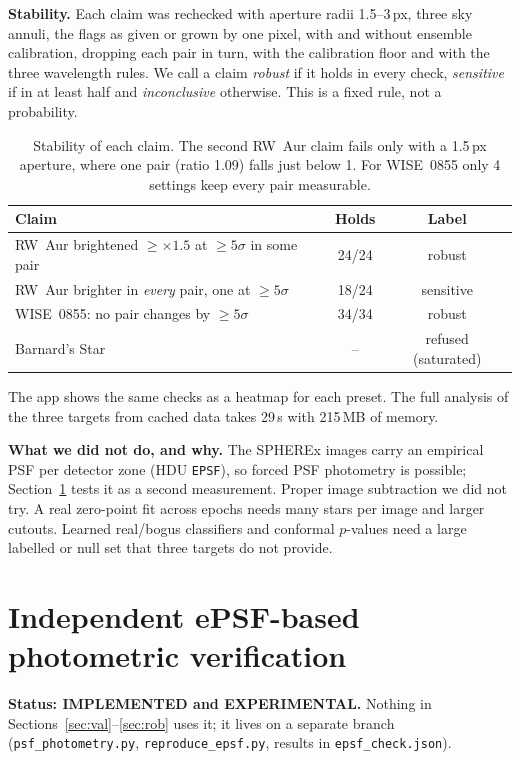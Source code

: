 \documentclass[11pt,a4paper]{article}
\begin{document}
\textbf{Stability.} Each claim was rechecked with aperture radii 1.5--3\,px, three sky annuli, the flags as given or
grown by one pixel, with and without ensemble calibration, dropping each pair in turn, with the calibration floor
and with the three wavelength rules. We call a claim \emph{robust} if it holds in every check, \emph{sensitive} if in
at least half and \emph{inconclusive} otherwise. This is a fixed rule, not a probability.
\begin{table}[h]\centering\small
\begin{tabular}{lcc}\toprule
Claim & Holds & Label\\\midrule
RW~Aur brightened $\ge\times1.5$ at $\ge5\sigma$ in some pair & 24/24 & robust\\
RW~Aur brighter in \emph{every} pair, one at $\ge5\sigma$ & 18/24 & sensitive\\
WISE~0855: no pair changes by $\ge5\sigma$ & 34/34 & robust\\
Barnard's Star & -- & refused (saturated)\\\bottomrule
\end{tabular}
\caption{Stability of each claim. The second RW~Aur claim fails only with a 1.5\,px aperture, where one pair
(ratio 1.09) falls just below 1. For WISE~0855 only 4 settings keep every pair measurable.}
\label{tab:rob}
\end{table}
The app shows the same checks as a heatmap for each preset. The full analysis of the three targets from cached data
takes 29\,s with 215\,MB of memory.

\textbf{What we did not do, and why.} The SPHEREx images carry an empirical PSF per detector zone (HDU \texttt{EPSF}),
so forced PSF photometry is possible; Section~\ref{sec:epsf} tests it as a second measurement. Proper image
subtraction \parencite{zackay2016} we did not try. A real zero-point fit across epochs \parencite[ubercalibration,][]{padmanabhan2008} needs many stars per
image and larger cutouts. Learned real/bogus classifiers \parencite{duev2019,mahabal2019} and conformal $p$-values
\parencite{bates2023} need a large labelled or null set that three targets do not provide.

\section{Independent ePSF-based photometric verification}\label{sec:epsf}
\textbf{Status: IMPLEMENTED and EXPERIMENTAL.} Nothing in Sections~\ref{sec:val}--\ref{sec:rob} uses it; it lives on a
separate branch (\texttt{psf\_photometry.py}, \texttt{reproduce\_epsf.py}, results in \texttt{epsf\_check.json}).
\end{document}
